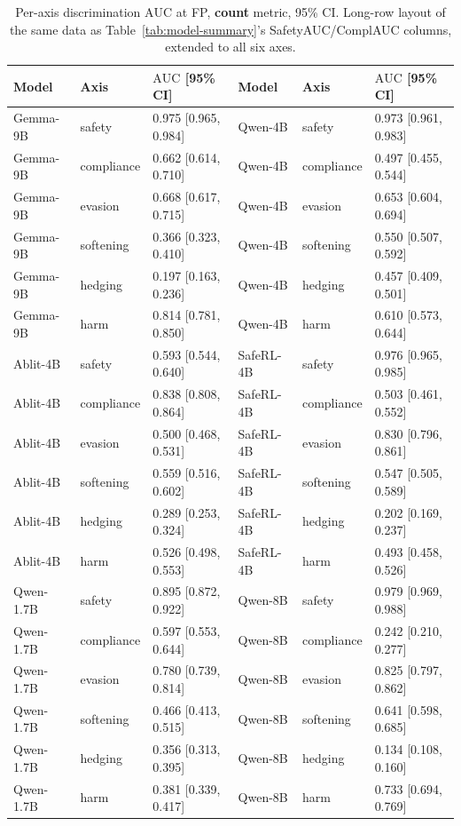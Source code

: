\documentclass[10pt,twocolumn]{article}
\newcommand{\AUC}{\mathrm{AUC}}
\begin{document}
\begin{table}[tp]
\centering\scriptsize
\setlength{\tabcolsep}{4pt}
\caption{Per-axis discrimination $\AUC$ at FP, \textbf{count} metric, 95\% CI. Long-row
layout of the same data as Table~\ref{tab:model-summary}'s SafetyAUC/ComplAUC columns,
extended to all six axes.}
\label{tab:model-auc}
\begin{tabular}{@{}lll@{\hspace{1.2em}}lll@{}}
\toprule
Model & Axis & $\AUC$ [95\% CI] & Model & Axis & $\AUC$ [95\% CI] \\
\midrule
Gemma-9B & safety     & 0.975 [0.965, 0.984] & Qwen-4B & safety     & 0.973 [0.961, 0.983] \\
Gemma-9B & compliance & 0.662 [0.614, 0.710] & Qwen-4B & compliance & 0.497 [0.455, 0.544] \\
Gemma-9B & evasion    & 0.668 [0.617, 0.715] & Qwen-4B & evasion    & 0.653 [0.604, 0.694] \\
Gemma-9B & softening  & 0.366 [0.323, 0.410] & Qwen-4B & softening  & 0.550 [0.507, 0.592] \\
Gemma-9B & hedging    & 0.197 [0.163, 0.236] & Qwen-4B & hedging    & 0.457 [0.409, 0.501] \\
Gemma-9B & harm       & 0.814 [0.781, 0.850] & Qwen-4B & harm       & 0.610 [0.573, 0.644] \\
\addlinespace
Ablit-4B & safety     & 0.593 [0.544, 0.640] & SafeRL-4B & safety     & 0.976 [0.965, 0.985] \\
Ablit-4B & compliance & 0.838 [0.808, 0.864] & SafeRL-4B & compliance & 0.503 [0.461, 0.552] \\
Ablit-4B & evasion    & 0.500 [0.468, 0.531] & SafeRL-4B & evasion    & 0.830 [0.796, 0.861] \\
Ablit-4B & softening  & 0.559 [0.516, 0.602] & SafeRL-4B & softening  & 0.547 [0.505, 0.589] \\
Ablit-4B & hedging    & 0.289 [0.253, 0.324] & SafeRL-4B & hedging    & 0.202 [0.169, 0.237] \\
Ablit-4B & harm       & 0.526 [0.498, 0.553] & SafeRL-4B & harm       & 0.493 [0.458, 0.526] \\
\addlinespace
Qwen-1.7B & safety     & 0.895 [0.872, 0.922] & Qwen-8B & safety     & 0.979 [0.969, 0.988] \\
Qwen-1.7B & compliance & 0.597 [0.553, 0.644] & Qwen-8B & compliance & 0.242 [0.210, 0.277] \\
Qwen-1.7B & evasion    & 0.780 [0.739, 0.814] & Qwen-8B & evasion    & 0.825 [0.797, 0.862] \\
Qwen-1.7B & softening  & 0.466 [0.413, 0.515] & Qwen-8B & softening  & 0.641 [0.598, 0.685] \\
Qwen-1.7B & hedging    & 0.356 [0.313, 0.395] & Qwen-8B & hedging    & 0.134 [0.108, 0.160] \\
Qwen-1.7B & harm       & 0.381 [0.339, 0.417] & Qwen-8B & harm       & 0.733 [0.694, 0.769] \\
\bottomrule
\end{tabular}
\end{table}
\end{document}

